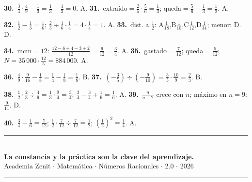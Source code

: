 \documentclass[11pt, letterpaper]{article}
\begin{document}
\textbf{30.}~$\tfrac{3}{4}\cdot\tfrac{4}{9}-\tfrac{1}{3}=\tfrac{1}{3}-\tfrac{1}{3}=0$. A. \quad
\textbf{31.}~extra\'ido$=\tfrac{2}{5}\cdot\tfrac{5}{6}=\tfrac{1}{3}$; queda$=\tfrac{5}{6}-\tfrac{1}{3}=\tfrac{1}{2}$. A.

\textbf{32.}~$\tfrac{1}{2}-\tfrac{1}{3}=\tfrac{1}{6}$; $\tfrac{2}{3}\div\tfrac{1}{6}\cdot\tfrac{1}{4}=4\cdot\tfrac{1}{4}=1$. A. \quad
\textbf{33.}~dist. a $\tfrac{1}{2}$: A$\tfrac{1}{18}$,B$\tfrac{1}{10}$,C$\tfrac{1}{12}$,D$\tfrac{1}{34}$; menor: D. D.

\textbf{34.}~mcm$=12$: $\tfrac{12-6+4-3+2}{12}=\tfrac{9}{12}=\tfrac{3}{4}$. A. \quad
\textbf{35.}~gastado$=\tfrac{7}{12}$; queda$=\tfrac{5}{12}$; $N=35\,000\cdot\tfrac{12}{5}=\$84\,000$. A.

\textbf{36.}~$\tfrac{4}{9}\cdot\tfrac{9}{16}-\tfrac{1}{8}=\tfrac{1}{4}-\tfrac{1}{8}=\tfrac{1}{8}$. B. \quad
\textbf{37.}~$(-\tfrac{3}{5})\div(-\tfrac{9}{10})=\tfrac{3}{5}\cdot\tfrac{10}{9}=\tfrac{2}{3}$. B.

\textbf{38.}~$\tfrac{1}{2}\cdot\tfrac{2}{3}\div\tfrac{4}{9}=\tfrac{1}{3}\cdot\tfrac{9}{4}=\tfrac{3}{4}$; $\tfrac{3}{4}-\tfrac{3}{4}+\tfrac{1}{6}=\tfrac{1}{6}$. A. \quad
\textbf{39.}~$\tfrac{n}{n+2}$ crece con $n$; m\'aximo en $n=9$: $\tfrac{9}{11}$. D.

\textbf{40.}~$\tfrac{3}{4}-\tfrac{1}{6}=\tfrac{7}{12}$; $\tfrac{1}{2}\cdot\tfrac{7}{12}\div\tfrac{7}{12}=\tfrac{1}{2}$; $\left(\tfrac{1}{2}\right)^2=\tfrac{1}{4}$. A.

\vspace{8pt}
\begin{center}
  \rule{\linewidth}{1.5pt}\\[4pt]
  {\large\bfseries\color{zenitnavy} La constancia y la pr\'actica son la clave del aprendizaje.}\\[2pt]
  {\color{zenitgold}\small Academia Zenit $\cdot$ Matem\'atica $\cdot$ N\'umeros Racionales $\cdot$ 2.0 $\cdot$ 2026}\\[4pt]
  \rule{\linewidth}{1.5pt}
\end{center}
\end{document}
